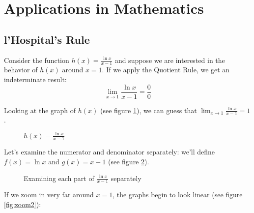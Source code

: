 \section{Applications in Mathematics}
\subsection{l'Hospital's Rule}
Consider the function $h(x) = \frac{\ln{x}}{x-1}$ and suppose we are interested 
in the behavior of $h(x)$ around $x=1$. If we apply the Quotient Rule, we get 
an indeterminate result: $$\lim_{x \to 1}\frac{\ln{x}}{x-1} = \frac{0}{0}$$ 

Looking at the graph of $h(x)$ (see figure \ref{fig:lhospital}), we can guess 
that $\lim_{x \to 1} \frac{\ln{x}}{x-1} = 1$. 

\begin{figure}[htbp]
\centering
{}
\caption{$h(x) = \frac{\ln{x}}{x - 1}$}
\label{fig:lhospital}
\end{figure}

Let's examine the numerator and denominator separately: we'll define $f(x) = 
\ln{x}$ and $g(x) = x - 1$ (see figure \ref{fig:zoom1}). 

\begin{figure}[htbp]
\centering
{}
\caption{Examining each part of $\frac{\ln{x}}{x-1}$ separately}
\label{fig:zoom1}
\end{figure}

If we zoom in very far around $x=1$, the graphs begin to look linear (see 
figure \ref{fig:zoom2}):

